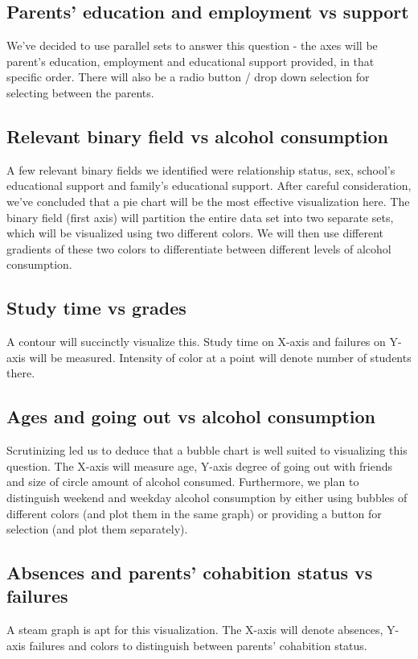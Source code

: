 \documentclass[titlepage, 12pt]{article}
\begin{document}
\subsection{Parents' education and employment vs support}
We've decided to use parallel sets to answer this question - the axes will be
parent's education, employment and educational support provided, in that
specific order. There will also be a radio button / drop down selection for
selecting between the parents.

\subsection{Relevant binary field vs alcohol consumption}
A few relevant binary fields we identified were relationship status, sex,
school's educational support and family's educational support.  After careful
consideration, we've concluded that a pie chart will be the most effective
visualization here. The binary field (first axis) will partition the entire data
set into two separate sets, which will be visualized using two different colors.
We will then use different gradients of these two colors to differentiate
between different levels of alcohol consumption.  

\subsection{Study time vs grades}
A contour will succinctly visualize this. Study time on X-axis and failures
on Y-axis will be measured. Intensity of color at a point will denote number of
students there.

\subsection{Ages and going out vs alcohol consumption}
Scrutinizing led us to deduce that a bubble chart is well suited to visualizing
this question. The X-axis will measure age, Y-axis degree of going out with
friends and size of circle amount of alcohol consumed. Furthermore, we plan to
distinguish weekend and weekday alcohol consumption by either using bubbles of
different colors (and plot them in the same graph) or providing a button for
selection (and plot them separately).

\subsection{Absences and parents' cohabition status vs failures}
A steam graph is apt for this visualization. The X-axis will denote absences,
Y-axis failures and colors to distinguish between parents' cohabition status.
\end{document}
